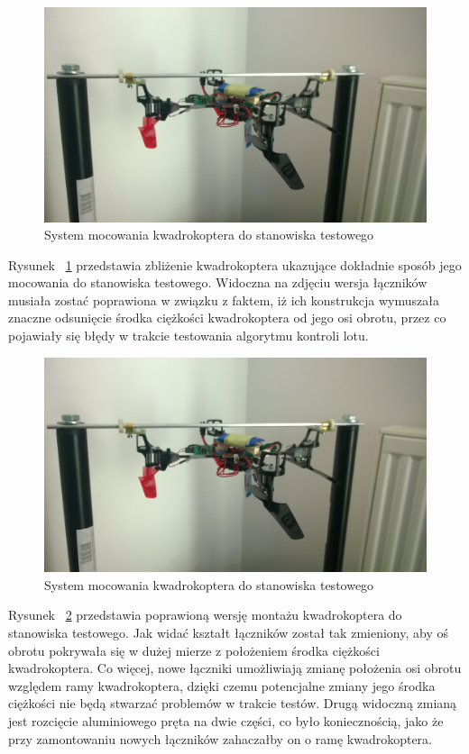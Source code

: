 \begin{figure}[H]
	\centering
	\includegraphics[scale=0.12]{Pictures/QuadroTestStationZoom.jpg}
	\caption[System mocowania kwadrokoptera do stanowiska testowego]{System mocowania kwadrokoptera do stanowiska testowego}
	\label{fig:QuadroTestStationZoom}
\end{figure}

Rysunek ~\ref{fig:QuadroTestStationZoom} przedstawia zbliżenie kwadrokoptera ukazujące dokładnie sposób jego mocowania do stanowiska testowego. Widoczna na zdjęciu wersja łączników musiała zostać poprawiona w związku z faktem, iż ich konstrukcja wymuszała znaczne odsunięcie środka ciężkości kwadrokoptera od jego osi obrotu, przez co pojawiały się błędy w trakcie testowania algorytmu kontroli lotu. 

\begin{figure}[H]
	\centering
	\includegraphics[scale=0.12]{Pictures/QuadroTestStationZoom.jpg}
	\caption[System mocowania kwadrokoptera do stanowiska testowego]{System mocowania kwadrokoptera do stanowiska testowego}
	\label{fig:QuadroTestStationZoom2}
\end{figure}

Rysunek ~\ref{fig:QuadroTestStationZoom2} przedstawia poprawioną wersję montażu kwadrokoptera do stanowiska testowego. Jak widać kształt łączników został tak zmieniony, aby oś obrotu pokrywała się w dużej mierze z położeniem środka ciężkości kwadrokoptera. Co więcej, nowe łączniki umożliwiają zmianę położenia osi obrotu względem ramy kwadrokoptera, dzięki czemu potencjalne zmiany jego środka ciężkości nie będą stwarzać problemów w trakcie testów. Drugą widoczną zmianą jest rozcięcie aluminiowego pręta na dwie części, co było koniecznością, jako że przy zamontowaniu nowych łączników zahaczałby on o ramę kwadrokoptera. 

